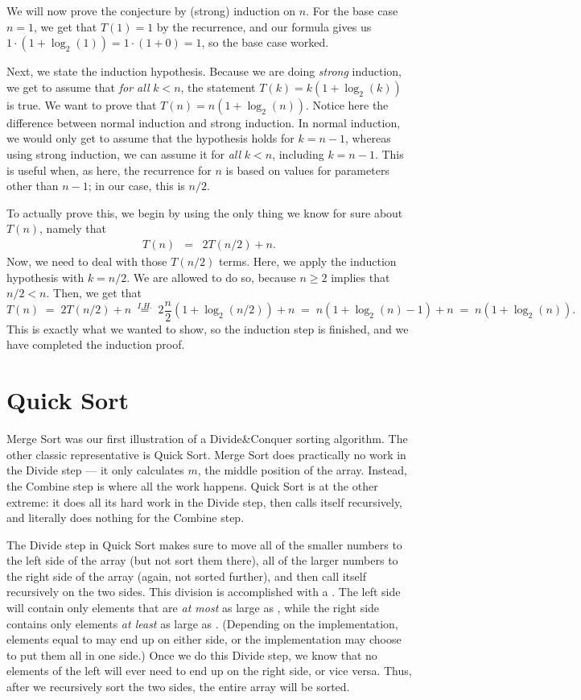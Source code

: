 We will now prove the conjecture by (strong) induction on $n$.
For the base case $n=1$, we get that $T(1) = 1$ by the recurrence, and
our formula gives us $1 \cdot (1 + \log_2(1)) = 1 \cdot (1+0) = 1$,
so the base case worked.

Next, we state the induction hypothesis. Because we are doing
\emph{strong} induction, we get to assume that \emph{for all} 
$k < n$, the statement $T(k) = k (1 + \log_2(k))$ is true. 
We want to prove that $T(n) = n (1 + \log_2(n))$. 
Notice here the difference between normal induction and strong
induction. In normal induction, we would only get to assume that the
hypothesis holds for $k=n-1$, whereas using strong induction, we can
assume it for \emph{all} $k < n$, including $k=n-1$. 
This is useful when, as here, the recurrence for $n$ is based on
values for parameters other than $n-1$; in our case, this is $n/2$.

To actually prove this, we begin by using the only thing we know for
sure about $T(n)$, namely that
\begin{eqnarray*}
T(n) & = & 2 T(n/2) + n.
\end{eqnarray*}
Now, we need to deal with those $T(n/2)$ terms. 
Here, we apply the induction hypothesis with $k=n/2$. 
We are allowed to do so, because $n \geq 2$ implies that $n/2 < n$.
Then, we get that
\[
T(n) \; = \; 2 T(n/2) + n
\; \stackrel{I.H.}{=} \; 2 \frac{n}{2} (1+\log_2(n/2)) + n
\; = \; n (1 + \log_2(n) - 1) + n
\; = \; n (1 + \log_2(n)).
\]
This is exactly what we wanted to show, so the induction step is
finished, and we have completed the induction proof.

\section{Quick Sort}
Merge Sort was our first illustration of a Divide\&Conquer sorting
algorithm. The other classic representative is Quick Sort. 
Merge Sort does practically no work in the Divide step --- it only
calculates $m$, the middle position of the array.
Instead, the Combine step is where all the work happens.
Quick Sort is at the other extreme: it does all its hard work in the
Divide step, then calls itself recursively, and literally does
nothing for the Combine step.

The Divide step in Quick Sort makes sure to move all of the smaller
numbers to the left side of the array (but not sort them there), all
of the larger numbers to the right side of the array (again, not
sorted further), and then call itself recursively on the two sides.
This division is accomplished with a  .
The left side will contain only elements that are \emph{at most} as
large as , while the right side contains only elements
\emph{at least} as large as .
(Depending on the implementation, elements equal to  may end
up on either side, or the implementation may choose to put them all in
one side.)
Once we do this Divide step, we know that no elements of the left
will ever need to end up on the right side, or vice versa.
Thus, after we recursively sort the two sides, the entire array will
be sorted.

